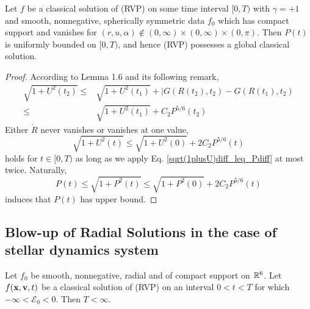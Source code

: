 \begin{theorem}
Let $f$ be a classical solution of (RVP) on some time interval $[0, T)$ with $\gamma=+1$ and smooth, nonnegative, spherically symmetric data $f_0$ which has compact support and vanishes for $(r, u, \alpha) \notin(0, \infty) \times(0, \infty) \times(0, \pi) $. Then $P(t)$ is uniformly bounded on $[0, T)$, and hence (RVP) possesses a global classical solution.
\end{theorem}
\begin{proof}
    According to Lemma 1.6 and its following remark,
    \begin{equation}
        \label{sqrt(1plusU)diff_leq_Pdiff}
        \begin{aligned}
            \sqrt{1+U^{2}\left(t_{2}\right)} \leq& \sqrt{1+U^{2}\left(t_{1}\right)}+| G\left(R\left(t_{2}\right), t_{2}\right)-G\left(R\left(t_{1}\right), t_{2}\right)\\
            \leq& \sqrt{1+U^{2}\left(t_{1}\right)}+C_{2} P^{5 / 6}\left(t_{2}\right)
        \end{aligned}
    \end{equation}
    Either $\dot{R}$ never vanishes or vanishes at one value, 
    \begin{equation}
\sqrt{1+U^{2}(t)} \leq \sqrt{1+U^{2}(0)}+2 C_{2} P^{5 / 6}(t)
\end{equation}
holds for $t\in[0,T)$ as long as we apply Eq. \ref{sqrt(1plusU)diff_leq_Pdiff} at most twice. Naturally, 
\begin{equation} 
P(t) \leq \sqrt{1+P^{2}(t)} \leq \sqrt{1+P^{2}(0)}+2 C_{2} P^{5 / 6}(t)
\end{equation}
induces that $P(t)$ has upper bound.
\end{proof}

\subsection{Blow-up of Radial Solutions in the case of stellar dynamics system}

\begin{theorem}
Let $f_0$ be smooth, nonnegative, radial and of compact support on ${\mathbb{R}}^{6}$. Let $f(\mathbf{x}, \mathbf{v}, t)$ be a classical solution of (RVP) on an interval $0<t<T$ for which $-\infty<\mathscr{E}_{0}<0$. Then $T<\infty$.
\end{theorem}

